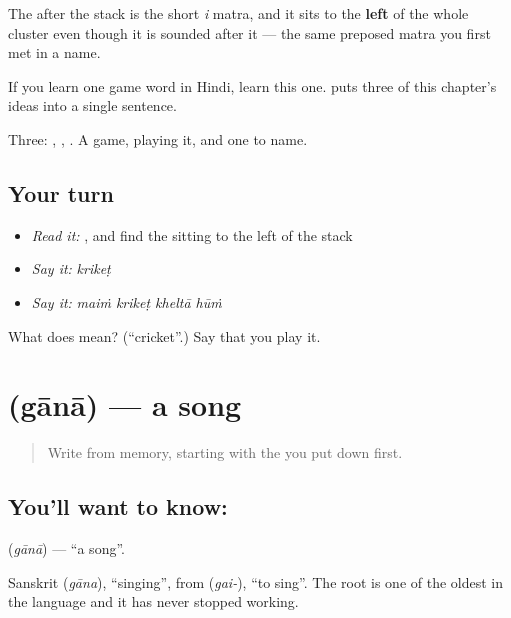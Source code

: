 The  after the stack is the short \emph{i} matra, and it sits to the \textbf{left} of the whole cluster even though it is sounded after it — the same preposed matra you first met in a name.

If you learn one game word in Hindi, learn this one. \textbf{   } puts three of this chapter's ideas into a single sentence.

\begin{grammarlens}[title={What you've built}]
Three: , , . A game, playing it, and one to name.
\end{grammarlens}

\subsection*{Your turn}
\begin{itemize}
\raggedright
  \item \emph{Read it:} , and find the  sitting to the left of the stack
  \item \emph{Say it:} \emph{krikeṭ}
  \item \emph{Say it:} \emph{maiṁ krikeṭ kheltā hūṁ}
\end{itemize}

\begin{tcolorbox}[breakable,colback=teal!4,colframe=teal!35!black,title={Before you move on}]
What does  mean? (\textquotedblleft{}cricket\textquotedblright{}.) Say that you play it.
\end{tcolorbox}
\section[gānā]{ (gānā) — a song}

\label{lesson:HI-C70-song}



\begin{quote}
Write \textbf{} from memory, starting with the  you put down first.
\end{quote}

\subsection*{You'll want to know: }
\textbf{} (\emph{gānā}) — \textquotedblleft{}a song\textquotedblright{}.

Sanskrit  (\emph{gāna}), \textquotedblleft{}singing\textquotedblright{}, from  (\emph{gai-}), \textquotedblleft{}to sing\textquotedblright{}. The root is one of the oldest in the language and it has never stopped working.

